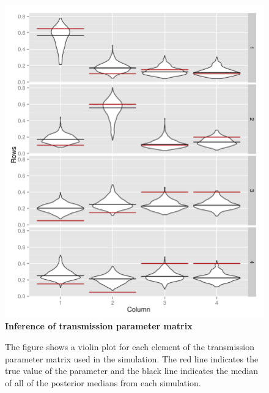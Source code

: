 \documentclass[11pt,a4paper]{report}
\begin{document}
\begin{figure}[h!]
\centering
\includegraphics[scale=0.6]{violinmat.png} \newline
{\bf Inference of transmission parameter matrix}
\caption{The figure shows a violin plot for each element of the transmission parameter matrix used in the simulation. The red line indicates the true value of the parameter and the black line indicates the median of all of the posterior medians from each simulation.}
\end{figure}
\end{document}
